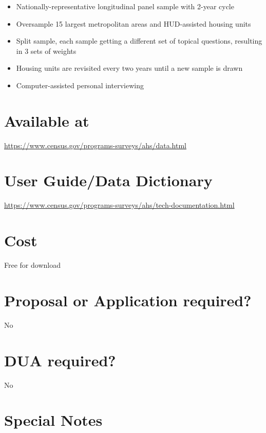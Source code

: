 \documentclass[
]{book}
\providecommand{\tightlist}{%
  \setlength{\itemsep}{0pt}\setlength{\parskip}{0pt}}
\begin{document}
\begin{itemize}
\tightlist
\item
  Nationally-representative longitudinal panel sample with 2-year cycle
\item
  Oversample 15 largest metropolitan areas and HUD-assisted housing units
\item
  Split sample, each sample getting a different set of topical questions, resulting in 3 sets of weights
\item
  Housing units are revisited every two years until a new sample is drawn
\item
  Computer-assisted personal interviewing
\end{itemize}

\hypertarget{available-at-6}{%
\section{Available at}\label{available-at-6}}

\url{https://www.census.gov/programs-surveys/ahs/data.html}

\hypertarget{user-guidedata-dictionary-6}{%
\section{User Guide/Data Dictionary}\label{user-guidedata-dictionary-6}}

\url{https://www.census.gov/programs-surveys/ahs/tech-documentation.html}

\hypertarget{cost-6}{%
\section{Cost}\label{cost-6}}

Free for download

\hypertarget{proposal-or-application-required-6}{%
\section{Proposal or Application required?}\label{proposal-or-application-required-6}}

No

\hypertarget{dua-required-6}{%
\section{DUA required?}\label{dua-required-6}}

No

\hypertarget{special-notes-6}{%
\section{Special Notes}\label{special-notes-6}}
\end{document}
